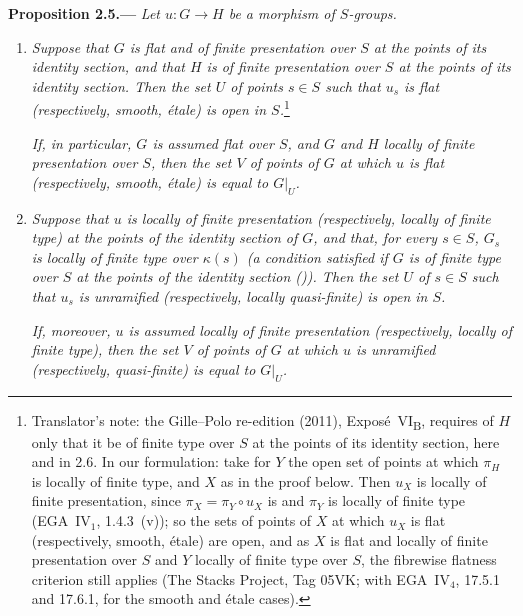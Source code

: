 
\medskip
{}\label{prop:sga3-VIB-2.5}%
\noindent\textbf{Proposition 2.5.---}
\emph{Let \(u:G\to H\) be a morphism of \(S\)-groups.}
\begin{enumerate}
\item[\textup{(i)}]\label{concl:sga3-VIB-2.5-i} \emph{Suppose that \(G\) is flat and of finite
  presentation over \(S\) at the points of its identity section, and that
  \(H\) is of finite presentation over \(S\) at the points of its identity
  section. Then the set \(U\) of points \(s\in S\) such that \(u_s\) is
  flat (respectively, smooth, \'etale) is open in \(S\).}\footnote{Translator's note: the
Gille--Polo re-edition (2011), Expos\'e~VI\textsubscript{B}, requires of \(H\) only that it be of finite
type over \(S\) at the points of its identity section, here and in 2.6. In our formulation: take for
\(Y\) the open set of points at which \(\pi_H\) is locally of finite type, and \(X\) as in the proof
below. Then \(u_X\) is locally of finite presentation, since \(\pi_X=\pi_Y\circ u_X\) is and \(\pi_Y\) is
locally of finite type (EGA~IV\(_1\), 1.4.3~(v)); so the sets of points of \(X\) at which \(u_X\) is flat
(respectively, smooth, \'etale) are open, and as \(X\) is flat and locally of finite presentation over
\(S\) and \(Y\) locally of finite type over \(S\), the fibrewise flatness criterion still applies (The
Stacks Project, Tag 05VK; with EGA~IV\(_4\), 17.5.1 and 17.6.1, for the smooth and \'etale cases).}

  \emph{If, in particular, \(G\) is assumed flat over \(S\), and \(G\) and
  \(H\) locally of finite presentation over \(S\), then the set \(V\) of
  points of \(G\) at which \(u\) is flat (respectively, smooth, \'etale) is
  equal to \(G|_U\).}

\item[\textup{(ii)}]\label{concl:sga3-VIB-2.5-ii} \emph{Suppose that \(u\) is locally of finite
  presentation (respectively, locally of finite type) at the points of the
  identity section of \(G\), and that, for every \(s\in S\), \(G_s\) is
  locally of finite type over \(\kappa(s)\) \textup(a condition satisfied if
  \(G\) is of finite type over \(S\) at the points of the identity section
  \textup{()}\textup). Then the set \(U\) of \(s\in S\) such that
  \(u_s\) is unramified (respectively, locally quasi-finite) is open in
  \(S\).}

  \emph{If, moreover, \(u\) is assumed locally of finite presentation
  (respectively, locally of finite type), then the set \(V\) of points of
  \(G\) at which \(u\) is unramified (respectively, quasi-finite) is equal
  to \(G|_U\).}
\end{enumerate}

